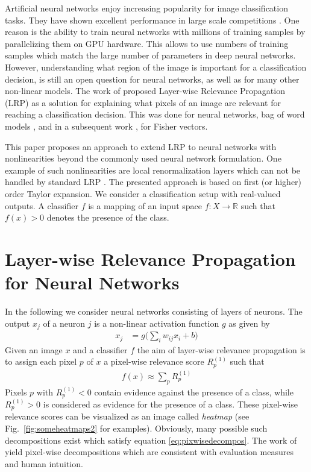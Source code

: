 \documentclass[runningheads,a4paper]{llncs}
\newcommand{\RR}{\mathbb{R}}
\begin{document}
Artificial neural networks enjoy increasing popularity for image classification tasks. They have shown excellent performance in large scale competitions \cite{DBLP:conf/nips/KrizhevskySH12}. One reason is the ability to train neural networks with millions of training samples by parallelizing them on GPU hardware. This allows to use numbers of training samples which match the large number of parameters in deep neural networks.
However, understanding what region of the image is important for a classification decision, is still an open question for neural networks, as well as for many other non-linear models. The work of \cite{BacBinMonKlaMueSam15} proposed Layer-wise Relevance Propagation (LRP) as a solution for explaining what pixels of an image are relevant for reaching a classification decision. This was done for neural networks, bag of word models \cite{Csurka04,DBLP:journals/pami/SandeGS10}, and in a subsequent work \cite{bach-arxiv15}, for Fisher vectors.

This paper proposes an approach to extend LRP to neural networks with nonlinearities beyond the commonly used neural network formulation. One example of such nonlinearities are local renormalization layers which can not be handled by standard LRP \cite{BacBinMonKlaMueSam15}. The presented approach is based on first (or higher) order Taylor expansion. We consider a classification setup with real-valued outputs. A classifier $f$ is a mapping of an input space $f: X \rightarrow \RR$ such that $f(x)>0$ denotes the presence of the class.

\section{Layer-wise Relevance Propagation for Neural Networks}
\label{sec:lrp}

In the following we consider neural networks consisting of layers of neurons. 
The output $x_j$ of a neuron $j$ is a non-linear activation function $g$ as given by
\begin{align}
x_j &=  g\Big(  {\textstyle \sum_i} w_{ij} x_i    +b \Big) 	\label{eq:neuron}
\end{align}
Given an image $x$ and a classifier $f$ the aim of layer-wise relevance propagation is to assign each pixel $p$ of $x$ a pixel-wise relevance score $R^{(1)}_p$ such that 
\begin{align}
f(x) \approx {\textstyle \sum_p} R^{(1)}_p \label{eq:pixwisedecompos}
\end{align}
\vskip -1mm
Pixels $p$ with $R^{(1)}_p<0$ contain evidence against the presence of a class, while $R^{(1)}_p>0$ is considered as evidence for the presence of a class. These pixel-wise relevance scores can be visualized as an image called \emph{heatmap} (see Fig.~\ref{fig:someheatmaps2} for examples). Obviously, many possible such decompositions exist which satisfy equation \ref{eq:pixwisedecompos}. The work of \cite{BacBinMonKlaMueSam15} yield pixel-wise decompositions which are consistent with evaluation measures \cite{DBLP:journals/corr/SamekBMBM15} and human intuition.
\end{document}

